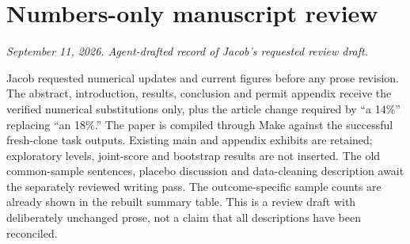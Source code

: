 \section*{Numbers-only manuscript review}
\textit{September 11, 2026. Agent-drafted record of Jacob's requested review draft.}

Jacob requested numerical updates and current figures before any prose revision.
The abstract, introduction, results, conclusion and permit appendix receive the
verified numerical substitutions only, plus the article change required by
``a 14\%'' replacing ``an 18\%.'' The paper is compiled through Make against
the successful fresh-clone task outputs. Existing main and appendix exhibits
are retained; exploratory levels, joint-score and bootstrap results are not
inserted. The old common-sample sentences, placebo discussion and data-cleaning
description await the separately reviewed writing pass. The outcome-specific
sample counts are already shown in the rebuilt summary table. This is a review
draft with deliberately unchanged prose, not a claim that all descriptions have
been reconciled.
